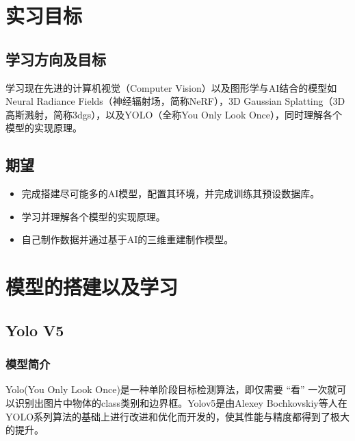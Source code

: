 \documentclass{nwputhesis}
\begin{document}
\maketitle

\newpage
\makecontent

\maketext
\fancyfoot[C]{\thepage}
\pagestyle{fancy}
\section{实习目标}
\subsection{学习方向及目标}
学习现在先进的计算机视觉（Computer Vision）以及图形学与AI结合的模型如Neural Radiance Fields（神经辐射场，简称NeRF），3D Gaussian Splatting（3D高斯溅射，简称3dgs），以及YOLO（全称You Only Look Once），同时理解各个模型的实现原理。
\subsection{期望}
\begin{itemize}
    \item 完成搭建尽可能多的AI模型，配置其环境，并完成训练其预设数据库。
    \item 学习并理解各个模型的实现原理。
    \item 自己制作数据并通过基于AI的三维重建制作模型。
\end{itemize}
\makespace
\section{模型的搭建以及学习}
\subsection{Yolo V5}
\subsubsection{模型简介}
Yolo(You Only Look Once)是一种单阶段目标检测算法，即仅需要 “看” 一次就可以识别出图片中物体的class类别和边界框。Yolov5是由Alexey Bochkovskiy等人在YOLO系列算法的基础上进行改进和优化而开发的，使其性能与精度都得到了极大的提升。
\end{document}
